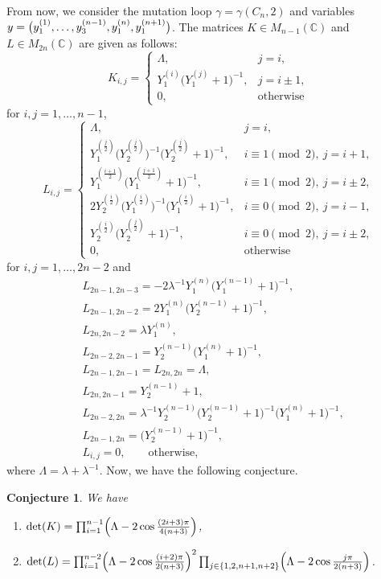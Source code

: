\documentclass[10pt,a4paper]{amsart}
\numberwithin{equation}{section}
\newtheorem{Conjecture}[Theorem]{Conjecture}
 { \theoremstyle{definition}
\newtheorem{Definition}[Theorem]{Definition}
\newtheorem{Note}[Theorem]{Note}
\newtheorem{Example}[Theorem]{Example}
\newtheorem{Remark}[Theorem]{Remark} }
\newcommand{\C}{{\mathbb C}}
\newcommand{\La}{\Lambda}
\begin{document}
From now, we consider the mutation loop $\gamma=\gamma(C_n,2)$ and variables $y=\bigl(\smash{y_1^{(1)},\dots,y_3^{(n-1)}},\allowbreak \smash{y_1^{(n)},y_1^{(n+1)}}\bigr)$.
The matrices $K\in M_{n-1}(\C)$ and $L\in M_{2n}(\C)$ are given as follows:
	\[K_{i,j}=\begin{cases}
	\La,& j=i,\\
	Y_1^{(i)}\bigl(Y_1^{(j)}+1\bigr)^{-1},& j=i\pm1 ,\\
	0,& \text{otherwise}
	\end{cases}\]
for $i,j=1,\dots,n-1$,
	\[L_{i,j}=\begin{cases}
		\La,& j=i,\\
		Y_1^{(\frac{j}{2})}\bigl(Y_2^{(\frac{j}{2})}\bigr)^{-1}\bigl(Y_2^{(\frac{j}{2})}+1\bigr)^{-1},& i\equiv1\pmod{2},\ j=i+1,\\
		Y_1^{(\frac{i+1}{2})}\bigl(Y_1^{(\frac{j+1}{2})}+1\bigr)^{-1},& i\equiv1\pmod{2},\ j=i\pm2,\\
		2Y_2^{(\frac{i}{2})}\bigl(Y_1^{(\frac{i}{2})}\bigr)^{-1}\bigl(Y_1^{(\frac{i}{2})}+1\bigr)^{-1},& i\equiv0\pmod{2},\ j=i-1,\\
		Y_2^{(\frac{i}{2})}\bigl(Y_2^{(\frac{j}{2})}+1\bigr)^{-1},& i\equiv0\pmod{2},\ j=i\pm2,\\
		0,& \text{otherwise}
	\end{cases}\]
for $i,j=1,\dots,2n-2$ and
	\begin{align*}
	&L_{2n-1,2n-3}=-2\lambda^{-1}Y_1^{(n)}\bigl(Y_1^{(n-1)}+1\bigr)^{-1},\\
	&L_{2n-1,2n-2}=2Y_1^{(n)}\bigl(Y_2^{(n-1)}+1\bigr)^{-1},\\
	&L_{2n,2n-2}=\lambda Y_1^{(n)},\\
	&L_{2n-2,2n-1}=Y_2^{(n-1)}\bigl(Y_1^{(n)}+1\bigr)^{-1},\\
	&L_{2n-1,2n-1}=L_{2n,2n}=\Lambda,\\
	&L_{2n,2n-1}=Y_2^{(n-1)}+1,\\
	&L_{2n-2,2n}=\lambda^{-1}Y_2^{(n-1)}\bigl(Y_2^{(n-1)}+1\bigr)^{-1}\bigl(Y_1^{(n)}+1\bigr)^{-1},\\
	&L_{2n-1,2n}=\bigl(Y_2^{(n-1)}+1\bigr)^{-1},\\
	&L_{i,j}=0,\qquad \text{otherwise} ,
	\end{align*}
where $\Lambda=\lambda+\lambda^{-1}$.
Now, we have the following conjecture.
	\begin{Conjecture}\label{Csol}
	We have
		\begin{enumerate}\itemsep=0pt
		\item[$1)$] $\det (K)=\prod_{i=1}^{n-1}\Bigl(\Lambda-2\cos{\frac{(2i+3)\pi}{4(n+3)}}\Bigr)$,
		\item[$2)$] $\det (L)=\prod_{i=1}^{n-2}\Bigl(\La-2\cos{\frac{(i+2)\pi}{2(n+3)}}\Bigr)^2\prod_{j\in\{1,2,n+1,n+2\}}\Bigl(\La-2\cos{\frac{j\pi}{2(n+3)}}\Bigr)$.
		\end{enumerate}
	\end{Conjecture}
\end{document}
